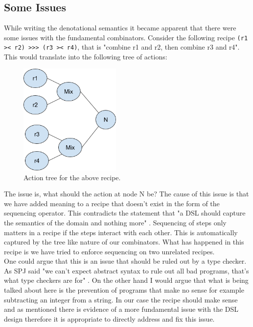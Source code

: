 \documentclass[11pt]{article}
\begin{document}
    \subsection{Some Issues}

    While writing the denotational semantics it became apparent that there were
    some issues with the fundamental combinators. Consider the following recipe
    \texttt{(r1 >< r2) >>> (r3 >< r4)}, that is "combine r1 and r2, then combine
    r3 and r4". This would translate into the following tree of actions:

    \newpage
    
    \begin{figure}[ht]
        \centering
            \includegraphics[width=5cm,keepaspectratio]{issue1.png}
        \caption{Action tree for the above recipe.}
    \end{figure}

    The issue is, what should the action at node N be? The cause of this issue is
    that we have added meaning to a recipe that doesn't exist in the form of the sequencing
    operator. This contradicts the statement that "a DSL should capture the semantics of the
    domain and nothing more" \cite{hudak}. Sequencing of steps only matters in a recipe if
    the steps interact with each other. This is automatically captured by the tree like nature
    of our combinators. What has happened in this recipe is we have tried to enforce sequencing
    on two unrelated recipes. \\

    One could argue that this is an issue that should be ruled out by a type checker. As SPJ
    said "we can’t expect abstract syntax to rule out all bad programs, that’s what type
    checkers are for" \cite{core}. On the other hand I would argue that what is being talked
    about here is the prevention of programs that make no sense for example subtracting an integer
    from a string. In our case the recipe should make sense and as mentioned there is evidence
    of a more fundamental issue with the DSL design therefore it is appropriate to directly address
    and fix this issue. \\
    
\end{document}
